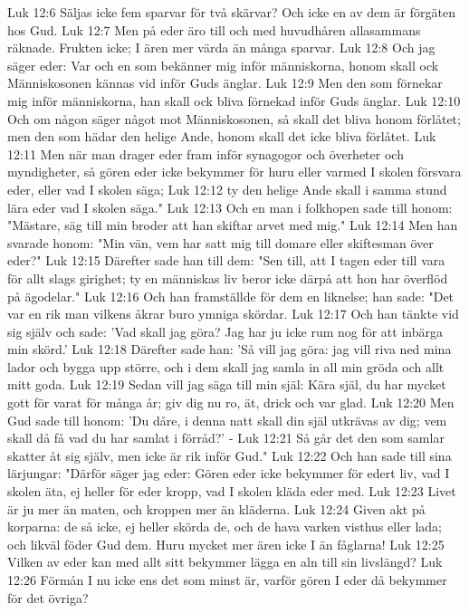 Luk 12:6  Säljas icke fem sparvar för två skärvar? Och icke en av dem är förgäten hos Gud.
Luk 12:7  Men på eder äro till och med huvudhåren allasammans räknade. Frukten icke; I ären mer värda än många sparvar.
Luk 12:8  Och jag säger eder: Var och en som bekänner mig inför människorna, honom skall ock Människosonen kännas vid inför Guds änglar.
Luk 12:9  Men den som förnekar mig inför människorna, han skall ock bliva förnekad inför Guds änglar.
Luk 12:10  Och om någon säger något mot Människosonen, så skall det bliva honom förlåtet; men den som hädar den helige Ande, honom skall det icke bliva förlåtet.
Luk 12:11  Men när man drager eder fram inför synagogor och överheter och myndigheter, så gören eder icke bekymmer för huru eller varmed I skolen försvara eder, eller vad I skolen säga;
Luk 12:12  ty den helige Ande skall i samma stund lära eder vad I skolen säga."
Luk 12:13  Och en man i folkhopen sade till honom: "Mästare, säg till min broder att han skiftar arvet med mig."
Luk 12:14  Men han svarade honom: "Min vän, vem har satt mig till domare eller skiftesman över eder?"
Luk 12:15  Därefter sade han till dem: "Sen till, att I tagen eder till vara för allt slags girighet; ty en människas liv beror icke därpå att hon har överflöd på ägodelar."
Luk 12:16  Och han framställde för dem en liknelse; han sade: "Det var en rik man vilkens åkrar buro ymniga skördar.
Luk 12:17  Och han tänkte vid sig själv och sade: 'Vad skall jag göra? Jag har ju icke rum nog för att inbärga min skörd.'
Luk 12:18  Därefter sade han: 'Så vill jag göra: jag vill riva ned mina lador och bygga upp större, och i dem skall jag samla in all min gröda och allt mitt goda.
Luk 12:19  Sedan vill jag säga till min själ: Kära själ, du har mycket gott för varat för många år; giv dig nu ro, ät, drick och var glad.
Luk 12:20  Men Gud sade till honom: 'Du dåre, i denna natt skall din själ utkrävas av dig; vem skall då få vad du har samlat i förråd?' -
Luk 12:21  Så går det den som samlar skatter åt sig själv, men icke är rik inför Gud."
Luk 12:22  Och han sade till sina lärjungar: "Därför säger jag eder: Gören eder icke bekymmer för edert liv, vad I skolen äta, ej heller för eder kropp, vad I skolen kläda eder med.
Luk 12:23  Livet är ju mer än maten, och kroppen mer än kläderna.
Luk 12:24  Given akt på korparna: de så icke, ej heller skörda de, och de hava varken visthus eller lada; och likväl föder Gud dem. Huru mycket mer ären icke I än fåglarna!
Luk 12:25  Vilken av eder kan med allt sitt bekymmer lägga en aln till sin livslängd?
Luk 12:26  Förmån I nu icke ens det som minst är, varför gören I eder då bekymmer för det övriga?
